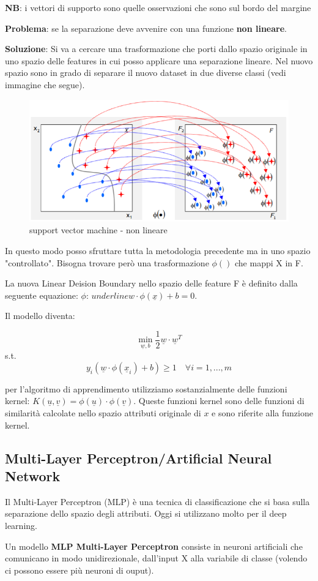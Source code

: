 \textbf{NB}: i vettori di supporto sono quelle osservazioni che sono sul bordo del margine

\textbf{Problema}: se la separazione deve avvenire con una funzione \textbf{non lineare}.
 
\textbf{Soluzione}: Si va a cercare una trasformazione che porti dallo spazio originale in uno spazio delle features in cui posso applicare una separazione lineare. Nel nuovo spazio sono in grado di separare il nuovo dataset in due diverse classi (vedi immagine che segue). 

\begin{figure}[H]
	\hspace{-0.5cm}
	\includegraphics[height=0.45 \linewidth]{classification/pict/svm_nonlinear.png}
	\caption{support vector machine - non lineare}
\end{figure}

In questo modo posso sfruttare tutta la metodologia precedente ma in uno spazio "controllato". Bisogna trovare però una trasformazione $\phi()$ che mappi X in F.

La nuova Linear Deision Boundary nello spazio delle feature F è definito dalla seguente equazione: $\phi$: $underline{w} \cdot \phi(\underline{x}) + b = 0$. 

Il modello diventa:

\[ \min_{\underline{w},b} \frac{1}{2}\underline{w} \cdot \underline{w}^T \]
\qquad s.t.
\[ y_i (\underline{w} \cdot \phi(\underline{x}_i) + b) \ge 1 \quad \forall i = 1, ..., m\]

per l'algoritmo di apprendimento utilizziamo sostanzialmente delle funzioni kernel: $K(\underline{u}, \underline{v}) = \phi(\underline{u}) \cdot \phi(\underline{v})$. Queste funzioni kernel sono delle funzioni di similarit\`a calcolate nello spazio attributi originale di $x$ e sono riferite alla funzione kernel.

\subsection{Multi-Layer Perceptron/Artificial Neural Network}
Il Multi-Layer Perceptron (MLP) è una tecnica di classificazione che si basa sulla separazione dello spazio degli attributi. Oggi si utilizzano molto per il deep learning.
\begin{defn}
	Un modello \textbf{MLP Multi-Layer Perceptron} consiste in neuroni artificiali che comunicano in modo unidirezionale, dall'input X alla variabile di classe (volendo ci possono essere pi\`u neuroni di ouput).
\end{defn}

